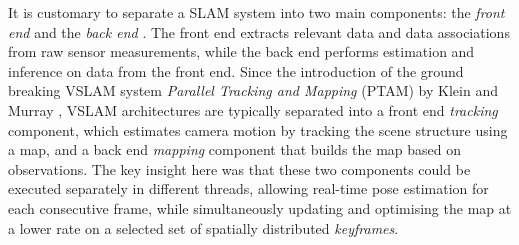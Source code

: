 It is customary to separate a SLAM system into two main components: the \textit{front end} and the \textit{back end} \cite{Cadena2016}.
The front end extracts relevant data and data associations from raw sensor measurements, while the back end performs estimation and inference on data from the front end.
Since the introduction of the ground breaking VSLAM system \textit{Parallel Tracking and Mapping} (PTAM) by Klein and Murray \cite{Klein2007ParallelWorkspaces}, VSLAM architectures are typically separated into a front end \textit{tracking} component, which estimates camera motion by tracking the scene structure using a map, and a back end \textit{mapping} component that builds the map based on observations.
The key insight here was that these two components could be executed separately in different threads, allowing real-time pose estimation for each consecutive frame, while simultaneously updating and optimising the map at a lower rate on a selected set of spatially distributed \textit{keyframes}.